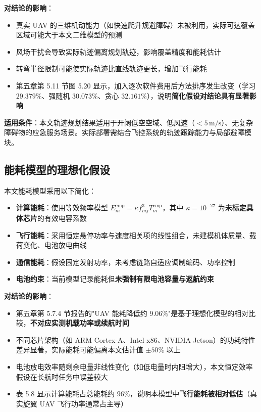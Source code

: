 \textbf{对结论的影响}：
\begin{itemize}
    \item 真实 UAV 的三维机动能力（如快速爬升规避障碍）未被利用，实际可达覆盖区域可能大于本文二维模型的预测
    \item 风场干扰会导致实际轨迹偏离规划轨迹，影响覆盖精度和能耗估计
    \item 转弯半径限制可能使实际轨迹比直线轨迹更长，增加飞行能耗
    \item 第五章第 5.11 节图 5.20 显示，加入逐次软件费用后方法排序发生改变（学习 $29.379\%$、强随机 $30.073\%$、贪心 $32.161\%$），说明\textbf{简化假设对结论具有显著影响}
\end{itemize}

\textbf{适用条件}：本文轨迹规划结果适用于开阔低空空域、低风速（$<5\,\mathrm{m/s}$）、无复杂障碍物的应急服务场景。实际部署需结合飞控系统的轨迹跟踪能力与局部避障模块。

\subsection{能耗模型的理想化假设}
\label{sec:energy-assumptions}

本文能耗模型采用以下简化：
\begin{itemize}
    \item \textbf{计算能耗}：使用等效频率模型 $E_m^{\mathrm{cmp}}=\kappa f_{mj}^3 T_m^{\mathrm{cmp}}$，其中 $\kappa=10^{-27}$ 为\textbf{未标定具体芯片}的有效电容系数
    \item \textbf{飞行能耗}：采用恒定悬停功率与速度相关项的线性组合，未建模机体质量、载荷变化、电池放电曲线
    \item \textbf{通信能耗}：假设固定发射功率，未考虑链路自适应调制编码、功率控制
    \item \textbf{电池约束}：当前模型记录能耗但\textbf{未强制有限电池容量与返航约束}
\end{itemize}

\textbf{对结论的影响}：
\begin{itemize}
    \item 第五章第 5.7.4 节报告的"UAV 能耗降低约 $9.06\%$"是基于理想化模型的相对比较，\textbf{不对应实测机载功率或续航时间}
    \item 不同芯片架构（如 ARM Cortex-A、Intel x86、NVIDIA Jetson）的功耗特性差异显著，实际能耗可能偏离本文估计值 $\pm50\%$ 以上
    \item 电池放电效率随剩余电量非线性变化（如低电量时内阻增大），本文恒定效率假设在长航时任务中误差较大
    \item 表 5.8 显示计算能耗占总能耗约 $96\%$，说明本模型中\textbf{飞行能耗被相对低估}（真实旋翼 UAV 飞行功率通常占主导）
\end{itemize}

